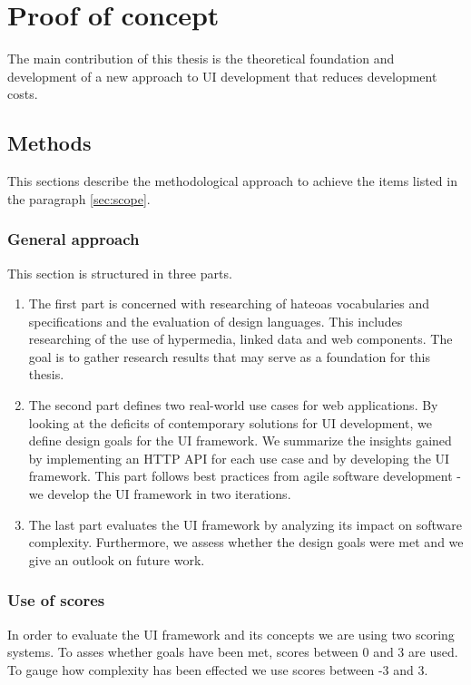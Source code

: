 \section{Proof of concept}
The main contribution of this thesis is the theoretical foundation and development of a new approach to UI development that reduces development costs.

\subsection{Methods}
This sections describe the methodological approach to achieve the items listed in the paragraph \ref{sec:scope}.

\subsubsection{General approach}
This section is structured in three parts.

\begin{enumerate}
\item The first part is concerned with researching of \gls{hateoas} vocabularies and specifications and the evaluation of design languages. This includes researching of the use of hypermedia, linked data and web components. The goal is to gather research results that may serve as a foundation for this thesis.
\item The second part defines two real-world use cases for web applications. By looking at the deficits of contemporary solutions for UI development, we define design goals for the UI framework. We summarize the insights gained by implementing an HTTP API for each use case and by developing the UI framework. This part follows best practices from agile software development - we develop the UI framework in two iterations.
\item The last part evaluates the UI framework by analyzing its impact on software complexity. Furthermore, we assess whether the design goals were met and we give an outlook on future work.
\end{enumerate}

\subsubsection{Use of scores}
In order to evaluate the UI framework and its concepts we are using two scoring systems. To asses whether goals have been met, scores between 0 and 3 are used. To gauge how complexity has been effected we use scores between -3 and 3.

